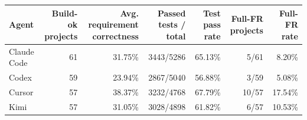 \begin{tabular}{lrrrrrr}
\toprule
Agent & Build-ok projects & Avg. requirement correctness & Passed tests / total & Test pass rate & Full-FR projects & Full-FR rate \\
\midrule
Claude Code & 61 & 31.75\% & 3443/5286 & 65.13\% & 5/61 & 8.20\% \\
Codex & 59 & 23.94\% & 2867/5040 & 56.88\% & 3/59 & 5.08\% \\
Cursor & 57 & 38.37\% & 3232/4768 & 67.79\% & 10/57 & 17.54\% \\
Kimi & 57 & 31.05\% & 3028/4898 & 61.82\% & 6/57 & 10.53\% \\
\bottomrule
\end{tabular}

